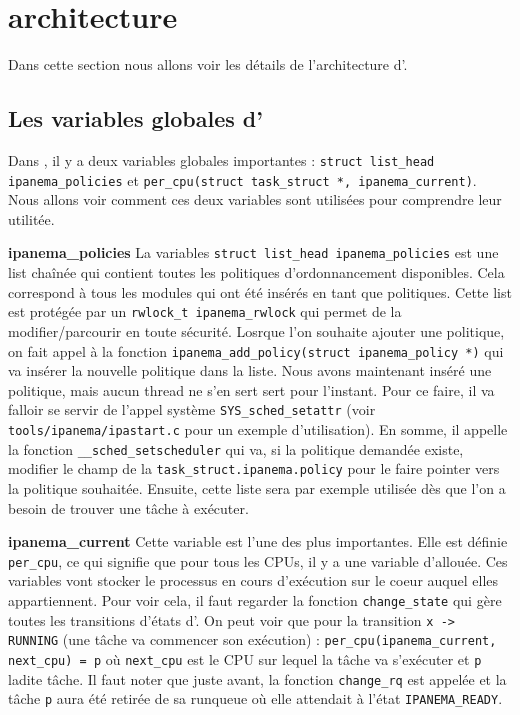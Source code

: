 \section{\ipa architecture}
\par Dans cette section nous allons voir les détails de l'architecture d'\ipa.

\subsection{Les variables globales d'\ipa}
Dans \ipa, il y a deux variables globales importantes : \texttt{struct list\_head ipanema\_policies} et \texttt{per\_cpu(struct task\_struct *, ipanema\_current)}. Nous allons voir comment ces deux variables sont utilisées pour comprendre leur utilitée.\newline

\par{\textbf{ipanema\_policies}} La variables \texttt{struct list\_head ipanema\_policies} est une list chaînée qui contient toutes les politiques d'ordonnancement disponibles. Cela correspond à tous les modules qui ont été insérés en tant que politiques. Cette list est protégée par un \texttt{rwlock\_t ipanema\_rwlock} qui permet de la modifier/parcourir en toute sécurité.\newline
Losrque l'on souhaite ajouter une politique, on fait appel à la fonction \texttt{ipanema\_add\_policy(struct ipanema\_policy *)} qui va insérer la nouvelle politique dans la liste.\newline
Nous avons maintenant inséré une politique, mais aucun thread ne s'en sert sert pour l'instant. Pour ce faire, il va falloir se servir de l'appel système \texttt{SYS\_sched\_setattr} (voir \texttt{tools/ipanema/ipastart.c} pour un exemple d'utilisation). En somme, il appelle la fonction \texttt{\_\_sched\_setscheduler} qui va, si la politique demandée existe, modifier le champ de la \texttt{task\_struct.ipanema.policy} pour le faire pointer vers la politique souhaitée. Ensuite, cette liste sera par exemple utilisée dès que l'on a besoin de trouver une tâche à exécuter.\newline

\par{\textbf{ipanema\_current}} Cette variable est l'une des plus importantes. Elle est définie \texttt{per\_cpu}, ce qui signifie que pour tous les CPUs, il y a une variable d'allouée. Ces variables vont stocker le processus en cours d'exécution sur le coeur auquel elles appartiennent. Pour voir cela, il faut regarder la fonction \texttt{change\_state} qui gère toutes les transitions d'états d'\ipa. On peut voir que pour la transition \texttt{x -> RUNNING} (une tâche va commencer son exécution) : \texttt{per\_cpu(ipanema\_current, next\_cpu) = p} où \texttt{next\_cpu} est le CPU sur lequel la tâche va s'exécuter et \texttt{p} ladite tâche.\newline
Il faut noter que juste avant, la fonction \texttt{change\_rq} est appelée et la tâche \texttt{p} aura été retirée de sa runqueue où elle attendait à l'état \texttt{IPANEMA\_READY}.

